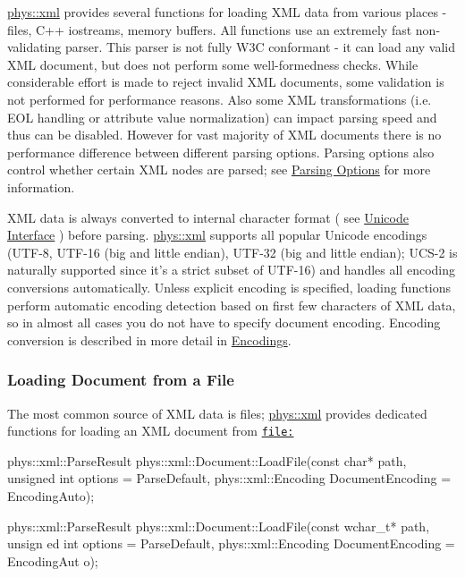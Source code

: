 \hyperlink{namespacephys_1_1xml}{phys::xml} provides several functions for loading XML data from various places -\/ files, C++ iostreams, memory buffers. All functions use an extremely fast non-\/validating parser. This parser is not fully W3C conformant -\/ it can load any valid XML document, but does not perform some well-\/formedness checks. While considerable effort is made to reject invalid XML documents, some validation is not performed for performance reasons. Also some XML transformations (i.e. EOL handling or attribute value normalization) can impact parsing speed and thus can be disabled. However for vast majority of XML documents there is no performance difference between different parsing options. Parsing options also control whether certain XML nodes are parsed; see \hyperlink{XMLManual_XMLLoadingParsingOptions}{Parsing Options} for more information. \par
 \par
 XML data is always converted to internal character format ( see \hyperlink{XMLManual_XMLUnicode}{Unicode Interface} ) before parsing. \hyperlink{namespacephys_1_1xml}{phys::xml} supports all popular Unicode encodings (UTF-\/8, UTF-\/16 (big and little endian), UTF-\/32 (big and little endian); UCS-\/2 is naturally supported since it's a strict subset of UTF-\/16) and handles all encoding conversions automatically. Unless explicit encoding is specified, loading functions perform automatic encoding detection based on first few characters of XML data, so in almost all cases you do not have to specify document encoding. Encoding conversion is described in more detail in \hyperlink{XMLManual_XMLLoadingEncodings}{Encodings}. \par
 \par
 \hypertarget{XMLManual_XMLLoadingFiles}{}\subsubsection{Loading Document from a File}\label{XMLManual_XMLLoadingFiles}
The most common source of XML data is files; \hyperlink{namespacephys_1_1xml}{phys::xml} provides dedicated functions for loading an XML document from \href{file:}{\tt file:} 
\begin{DoxyCode}
 phys::xml::ParseResult phys::xml::Document::LoadFile(const char* path, unsigned 
      int options = ParseDefault, phys::xml::Encoding DocumentEncoding = EncodingAuto);
      
 phys::xml::ParseResult phys::xml::Document::LoadFile(const wchar_t* path, unsign
      ed int options = ParseDefault, phys::xml::Encoding DocumentEncoding = EncodingAut
      o);
\end{DoxyCode}
